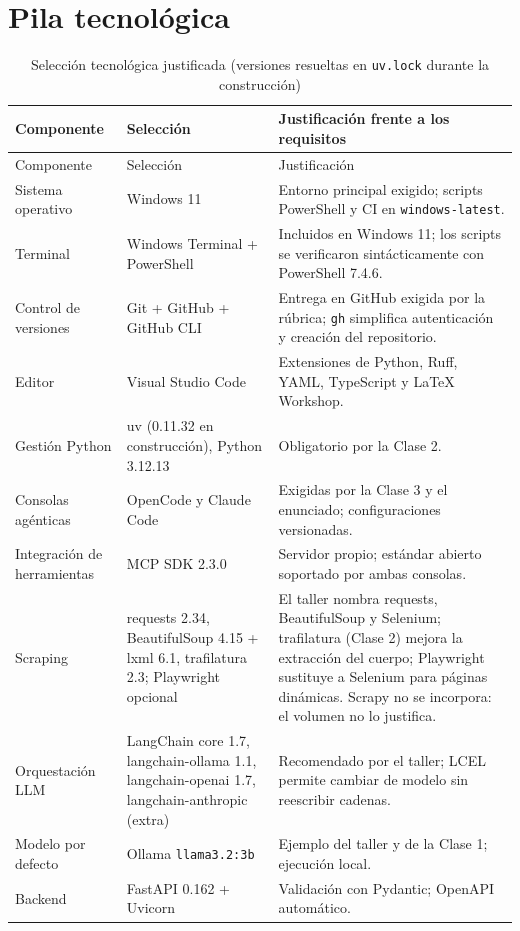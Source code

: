 \chapter{Pila tecnológica}\label{cap:pila}
\begin{longtable}{@{}P{2.8cm}P{3.4cm}P{9.0cm}@{}}
\caption{Selección tecnológica justificada (versiones resueltas en \texttt{uv.lock} durante la construcción)}\label{tab:pila}\\\toprule
Componente & Selección & Justificación frente a los requisitos\\\midrule\endfirsthead
\toprule Componente & Selección & Justificación\\\midrule\endhead
Sistema operativo & Windows 11 & Entorno principal exigido; scripts PowerShell y CI en \texttt{windows-latest}.\\
Terminal & Windows Terminal + PowerShell & Incluidos en Windows 11; los scripts se verificaron sintácticamente con PowerShell 7.4.6.\\
Control de versiones & Git + GitHub + GitHub CLI & Entrega en GitHub exigida por la rúbrica; \texttt{gh} simplifica autenticación y creación del repositorio.\\
Editor & Visual Studio Code & Extensiones de Python, Ruff, YAML, TypeScript y LaTeX Workshop.\\
Gestión Python & uv (0.11.32 en construcción), Python 3.12.13 & Obligatorio por la Clase 2.\\
Consolas agénticas & OpenCode y Claude Code & Exigidas por la Clase 3 y el enunciado; configuraciones versionadas.\\
Integración de herramientas & MCP SDK 2.3.0 & Servidor propio; estándar abierto soportado por ambas consolas.\\
Scraping & requests 2.34, BeautifulSoup 4.15 + lxml 6.1, trafilatura 2.3; Playwright opcional & El taller nombra requests, BeautifulSoup y Selenium; trafilatura (Clase 2) mejora la extracción del cuerpo; Playwright sustituye a Selenium para páginas dinámicas. Scrapy no se incorpora: el volumen no lo justifica.\\
Orquestación LLM & LangChain core 1.7, langchain-ollama 1.1, langchain-openai 1.7, langchain-anthropic (extra) & Recomendado por el taller; LCEL permite cambiar de modelo sin reescribir cadenas.\\
Modelo por defecto & Ollama \texttt{llama3.2:3b} & Ejemplo del taller y de la Clase 1; ejecución local.\\
Backend & FastAPI 0.162 + Uvicorn & Validación con Pydantic; OpenAPI automático.\\

\end{longtable}

